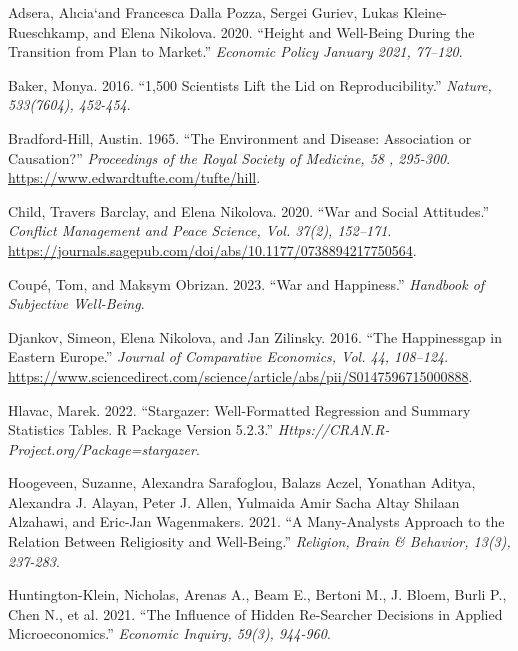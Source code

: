 \documentclass[
  letterpaper,
  DIV=11,
  numbers=noendperiod]{scrartcl}
\newlength{\cslhangindent}
\newlength{\cslentryspacingunit} %
\newenvironment{CSLReferences}[2] %
 {%
  \setlength{\parindent}{0pt}
  \ifodd #1
  \let\oldpar\par
  \def\par{\hangindent=\cslhangindent\oldpar}
  \fi
  \setlength{\parskip}{#2\cslentryspacingunit}
 }%
 {}
\begin{document}
\hypertarget{refs}{}
\begin{CSLReferences}{1}{0}
\leavevmode{}%
Adsera, Alıcia`and Francesca Dalla Pozza, Sergei Guriev, Lukas
Kleine-Rueschkamp, and Elena Nikolova. 2020. {``Height and Well-Being
During the Transition from Plan to Market.''} \emph{Economic Policy
January 2021, 77--120}.

\leavevmode{}%
Baker, Monya. 2016. {``1,500 Scientists Lift the Lid on
Reproducibility.''} \emph{Nature, 533(7604), 452-454}.

\leavevmode{}%
Bradford-Hill, Austin. 1965. {``The Environment and Disease: Association
or Causation?''} \emph{Proceedings of the Royal Society of Medicine, 58
, 295-300}. \url{https://www.edwardtufte.com/tufte/hill}.

\leavevmode{}%
Child, Travers Barclay, and Elena Nikolova. 2020. {``War and Social
Attitudes.''} \emph{Conflict Management and Peace Science, Vol. 37(2),
152--171}.
\url{https://journals.sagepub.com/doi/abs/10.1177/0738894217750564}.

\leavevmode{}%
Coupé, Tom, and Maksym Obrizan. 2023. {``War and Happiness.''}
\emph{Handbook of Subjective Well-Being}.

\leavevmode{}%
Djankov, Simeon, Elena Nikolova, and Jan Zilinsky. 2016. {``The
Happinessgap in Eastern Europe.''} \emph{Journal of Comparative
Economics, Vol. 44, 108--124}.
\url{https://www.sciencedirect.com/science/article/abs/pii/S0147596715000888}.

\leavevmode{}%
Hlavac, Marek. 2022. {``Stargazer: Well-Formatted Regression and Summary
Statistics Tables. R Package Version 5.2.3.''}
\emph{Https://CRAN.R-Project.org/Package=stargazer}.

\leavevmode{}%
Hoogeveen, Suzanne, Alexandra Sarafoglou, Balazs Aczel, Yonathan Aditya,
Alexandra J. Alayan, Peter J. Allen, Yulmaida Amir Sacha Altay Shilaan
Alzahawi, and Eric-Jan Wagenmakers. 2021. {``A Many-Analysts Approach to
the Relation Between Religiosity and Well-Being.''} \emph{Religion,
Brain \& Behavior, 13(3), 237-283}.

\leavevmode{}%
Huntington-Klein, Nicholas, Arenas A., Beam E., Bertoni M., J. Bloem,
Burli P., Chen N., et al. 2021. {``The Influence of Hidden Re-Searcher
Decisions in Applied Microeconomics.''} \emph{Economic Inquiry, 59(3),
944-960}.


\end{CSLReferences}
\end{document}
